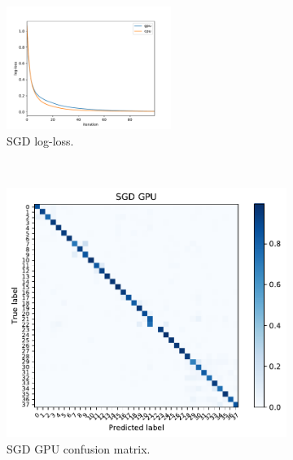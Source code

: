 \documentclass[conference]{IEEEtran}
\begin{document}
\begin{figure}
	\centering
	\begin{subfigure}[b]{.3\textwidth}
		\includegraphics[width=\textwidth,height=4cm]{results/sgd_losloss}
		\caption{SGD log-loss.}
		\label{fig:sgd_cpu_gpu}
	\end{subfigure}
	~ %
	\begin{subfigure}[b]{0.2\textwidth}
		\includegraphics[width=\textwidth]{results/plants_confusion_matrix_sgd_gpu}
		\caption{SGD GPU confusion matrix.}
		\label{fig:sgd_gpu_performance}
	\end{subfigure}
	~ %
	\begin{subfigure}[b]{0.2\textwidth}

\end{subfigure}
\end{figure}
\end{document}
